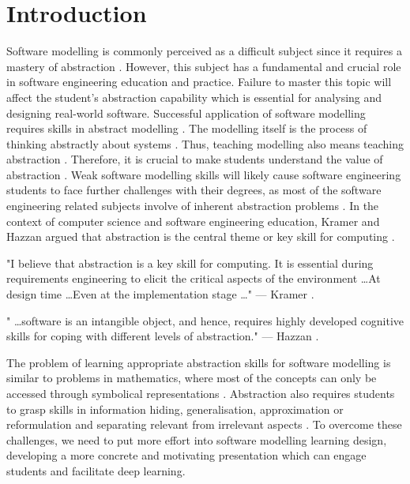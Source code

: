 \documentclass[12pt, a4paper]{report}
\begin{document}
\tableofcontents
{}

\chapter{Introduction}

Software modelling is commonly perceived as a difficult subject since it requires a mastery of abstraction \cite{Borstler2012}. However, this subject has a fundamental and crucial role in software engineering education and practice. Failure to master this topic will affect the student’s abstraction capability which is essential for analysing and designing real-world software. Successful application of software modelling requires skills in abstract modelling \cite{whittle2013industrial}. The modelling itself is the process of thinking abstractly about systems \cite{bezivin2009teaching}. Thus, teaching modelling also means teaching abstraction \cite{engels2005teaching}. Therefore, it is crucial to make students understand the value of abstraction \cite{bezivin2009teaching}. Weak software modelling skills will likely cause software engineering students to face further challenges with their degrees, as most of the software engineering related subjects involve of inherent abstraction problems \cite{Kramer2007}. In the context of computer science and software engineering education, Kramer and Hazzan argued that abstraction is the central theme or key skill for computing \cite{Kramer2007, hazzan2008reflections}.

\begin{displayquote}
"I believe that abstraction is a key skill for computing. It is essential during requirements engineering to elicit the critical aspects of the environment \dots At design time \dots Even at the implementation stage \dots " --- Kramer \cite{Kramer2007}.
\end{displayquote}

\begin{displayquote}
" \dots software is an intangible object, and hence, requires highly developed cognitive skills for coping with different levels of abstraction." --- Hazzan \cite{hazzan2008reflections}.
\end{displayquote}

The problem of learning appropriate abstraction skills for software modelling is similar to problems in mathematics, where most of the concepts can only be accessed through symbolical representations \cite{Duval2006}. Abstraction also requires students to grasp skills in information hiding, generalisation, approximation or reformulation and separating relevant from irrelevant aspects \cite{Saitta2013}. To overcome these challenges, we need to put more effort into software modelling learning design, developing a more concrete and motivating presentation which can engage students and facilitate deep learning.
\end{document}
